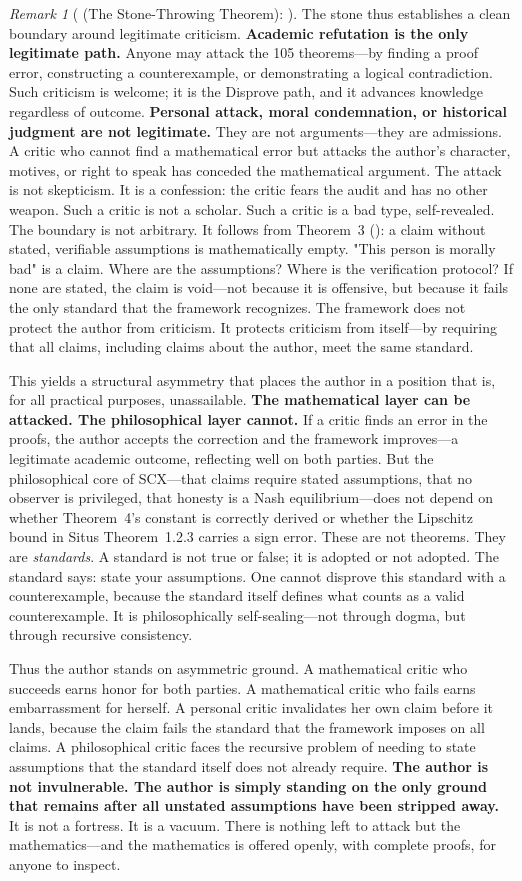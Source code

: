 \documentclass[12pt,a4paper]{article}
\theoremstyle{definition}
\theoremstyle{remark}
\newtheorem{remark}{Remark}[section]
\begin{document}
\begin{remark}[ (The Stone-Throwing Theorem): ]
The stone thus establishes a clean boundary around legitimate criticism. \textbf{Academic refutation is the only legitimate path.} Anyone may attack the 105 theorems—by finding a proof error, constructing a counterexample, or demonstrating a logical contradiction. Such criticism is welcome; it is the Disprove path, and it advances knowledge regardless of outcome. \textbf{Personal attack, moral condemnation, or historical judgment are not legitimate.} They are not arguments—they are admissions. A critic who cannot find a mathematical error but attacks the author's character, motives, or right to speak has conceded the mathematical argument. The attack is not skepticism. It is a confession: the critic fears the audit and has no other weapon. Such a critic is not a scholar. Such a critic is a bad type, self-revealed. The boundary is not arbitrary. It follows from Theorem~3 (): a claim without stated, verifiable assumptions is mathematically empty. "This person is morally bad" is a claim. Where are the assumptions? Where is the verification protocol? If none are stated, the claim is void—not because it is offensive, but because it fails the only standard that the framework recognizes. The framework does not protect the author from criticism. It protects criticism from itself—by requiring that all claims, including claims about the author, meet the same standard.

This yields a structural asymmetry that places the author in a position that is, for all practical purposes, unassailable. \textbf{The mathematical layer can be attacked. The philosophical layer cannot.} If a critic finds an error in the proofs, the author accepts the correction and the framework improves—a legitimate academic outcome, reflecting well on both parties. But the philosophical core of SCX—that claims require stated assumptions, that no observer is privileged, that honesty is a Nash equilibrium—does not depend on whether Theorem~4's constant is correctly derived or whether the Lipschitz bound in Situs Theorem~1.2.3 carries a sign error. These are not theorems. They are \textit{standards}. A standard is not true or false; it is adopted or not adopted. The standard says: state your assumptions. One cannot disprove this standard with a counterexample, because the standard itself defines what counts as a valid counterexample. It is philosophically self-sealing—not through dogma, but through recursive consistency.

Thus the author stands on asymmetric ground. A mathematical critic who succeeds earns honor for both parties. A mathematical critic who fails earns embarrassment for herself. A personal critic invalidates her own claim before it lands, because the claim fails the standard that the framework imposes on all claims. A philosophical critic faces the recursive problem of needing to state assumptions that the standard itself does not already require. \textbf{The author is not invulnerable. The author is simply standing on the only ground that remains after all unstated assumptions have been stripped away.} It is not a fortress. It is a vacuum. There is nothing left to attack but the mathematics—and the mathematics is offered openly, with complete proofs, for anyone to inspect.


\end{remark}
\end{document}
